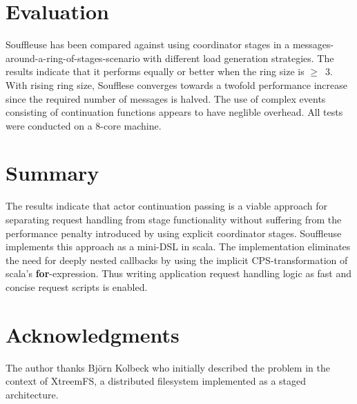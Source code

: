 \documentclass{sig-alternate}
\begin{document}


\section{Evaluation}

Souffleuse has been compared against using coordinator stages in a
messages-around-a-ring-of-stages-scenario with different load generation strategies. The results
indicate that it performs equally or better when the ring size is $\ge$~3. With rising ring size,
Soufflese converges towards a twofold performance increase since the required number of messages is
halved. The use of complex events consisting of continuation functions appears to have neglible
overhead. All tests were conducted on a 8-core machine.


\section{Summary}                                          

The results indicate that actor continuation passing is a viable approach for separating request
handling from stage functionality without suffering from the performance penalty introduced by using
explicit coordinator stages. Souffleuse implements this approach as a mini-DSL in scala. The
implementation eliminates the need for deeply nested callbacks by using the implicit
CPS-transformation of scala's \textbf{for}-expression. Thus writing application request handling
logic as fast and concise request scripts is enabled.

\section{Acknowledgments}

The author thanks Bj\"orn Kolbeck who initially described the problem in the context of XtreemFS,
a distributed filesystem implemented as a staged architecture.
           

  
\end{document}
